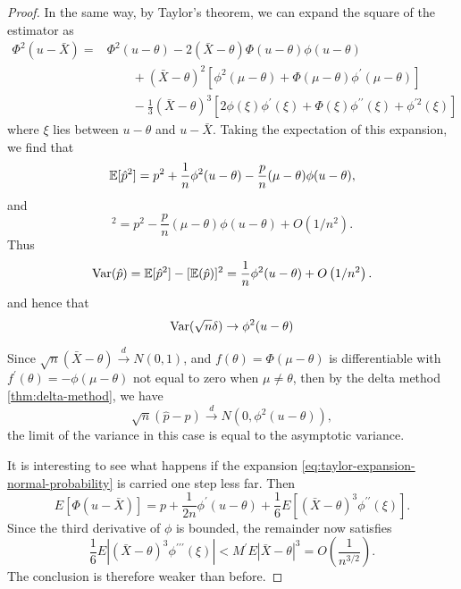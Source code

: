 \begin{proof}
	In the same way, by Taylor's theorem, we can expand the square of the estimator as
	\begin{equation*}
		\begin{aligned}
			\Phi^{2}(u-\bar{X})= & \Phi^{2}(u-\theta)-2(\bar{X}-\theta)\Phi(u-\theta)\phi(u-\theta)                                                                      \\
			                     & \qquad+(\bar{X}-\theta)^{2}\left[\phi^{2}(\mu-\theta)+\Phi(\mu-\theta)\phi^{\prime}(\mu-\theta)\right]                                \\
			                     & \qquad-\frac{1}{3}(\bar{X}-\theta)^{3}\left[2\phi(\xi)\phi^{\prime}(\xi)+\Phi(\xi)\phi^{\prime\prime}(\xi)+\phi^{\prime2}(\xi)\right]
		\end{aligned}
	\end{equation*}
	where $\xi$ lies between $u-\theta$ and $u-\bar{X}$. Taking the expectation of this expansion, we find that
	\begin{equation*}
		{\mathbb E}[\hat{p}^{2}]=p^{2}+\frac{1}{n}\phi^{2}(u-\theta)-\frac{p}{n}(\mu-\theta)\phi(u-\theta),
	\end{equation*}
	and
	\begin{equation*}
		[\bbE(\hat{p})]^{2}=p^{2}-\frac{p}{n}(\mu-\theta)\phi(u-\theta)+O\left(1/n^{2}\right).
	\end{equation*}
	Thus
	\begin{equation*}
		\mathrm{Var}(\hat{p})={\mathbb E}[\hat{p}^{2}]-[{\mathbb E}(\hat{p})]^{2}=\frac{1}{n}\phi^{2}(u-\theta)+O\left(1/n^{2}\right).
	\end{equation*}
	and hence that
	\begin{equation*}
		\mathrm{Var}(\sqrt{n} \delta) \rightarrow \phi^2(u-\theta)
	\end{equation*}

	Since $\sqrt{n}(\bar{X}-\theta) \stackrel{d}{\rightarrow} N\left(0,1\right)$, and $f(\theta)=\Phi(\mu-\theta)$ is differentiable with $f^{\prime}(\theta)=-\phi(\mu-\theta)$ not equal to zero when $\mu\neq\theta$, then by the delta method \eqref{thm:delta-method}, we have
	\begin{equation*}
		\sqrt{n}(\hat{p}-p)\stackrel{d}{\rightarrow}N\left(0,\phi^{2}(u-\theta)\right),
	\end{equation*}
	the limit of the variance in this case is equal to the asymptotic variance.

	It is interesting to see what happens if the expansion \eqref{eq:taylor-expansion-normal-probability} is carried one step less far. Then
	\begin{equation*}
		E[\Phi(u-\bar{X})]=p+\frac{1}{2 n} \phi^{\prime}(u-\theta)+\frac{1}{6} E\left[(\bar{X}-\theta)^3 \phi^{\prime \prime}(\xi)\right] .
	\end{equation*}
	Since the third derivative of $\phi$ is bounded, the remainder now satisfies
	\begin{equation*}
		\frac{1}{6} E\left|(\bar{X}-\theta)^3 \phi^{\prime \prime \prime}(\xi)\right|<M^{\prime} E|\bar{X}-\theta|^3=O\left(\frac{1}{n^{3 / 2}}\right) .
	\end{equation*}
	The conclusion is therefore weaker than before.
\end{proof}
